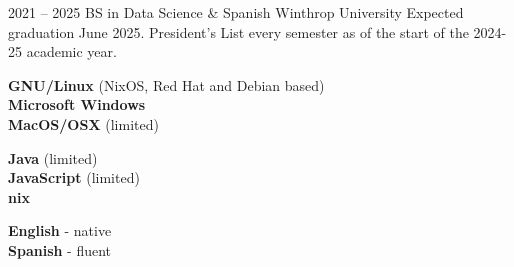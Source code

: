 \documentclass[9pt]{developercv} %
\begin{document}


\begin{entrylist}
	\entry
		{2021 -- 2025}
        {BS in Data Science \& Spanish}
		{Winthrop University}
		{Expected graduation June 2025. President's List every semester as of the start of the 2024-25 academic year.}
\end{entrylist}


\bigskip
\begin{minipage}[t]{0.3\textwidth}
	\vspace{-\baselineskip} %


    \textbf{GNU/Linux} {\footnotesize(NixOS, Red Hat and Debian based)} \\
    \textbf{Microsoft Windows} \\
    \textbf{MacOS/OSX} (limited) \\
\end{minipage}
\hfill
\begin{minipage}[t]{0.3\textwidth}
	\vspace{-\baselineskip} %
	
	
    \textbf{Java} (limited) \\
    \textbf{JavaScript} (limited) \\
    \textbf{nix} \\ 
\end{minipage}
\hfill
\begin{minipage}[t]{0.3\textwidth}
	\vspace{-\baselineskip} %
	
	
	\textbf{English} - native\\
	\textbf{Spanish} - fluent\\
\end{minipage}
\end{document}
